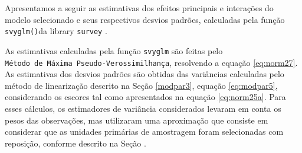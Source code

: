 \documentclass[]{book}
\numberwithin{example}{chapter}
\numberwithin{remark}{chapter}
\numberwithin{definition}{chapter}
\begin{document}
Apresentamos a seguir as estimativas dos efeitos principais e interações
do modelo selecionado e seus respectivos desvios padrões, calculadas
pela função \texttt{svyglm()}da library \texttt{survey}
\citep{R-survey}.

As estimativas calculadas pela função \texttt{svyglm} são feitas pelo
\texttt{Método\ de\ Máxima\ Pseudo-Verossimilhança}, resolvendo a
equação \eqref{eq:norm27}. As estimativas dos desvios padrões são obtidas
das variâncias calculadas pelo método de linearização descrito na Seção
\ref{modpar3}, equação \eqref{eq:modpar5}, considerando os escores tal
como apresentados na equação \eqref{eq:norm25a}. Para esses cálculos, os
estimadores de variância considerados levaram em conta os pesos das
observações, mas utilizaram uma aproximação que consiste em considerar
que as unidades primárias de amostragem foram selecionadas com
reposição, conforme descrito na Seção .
\end{document}
